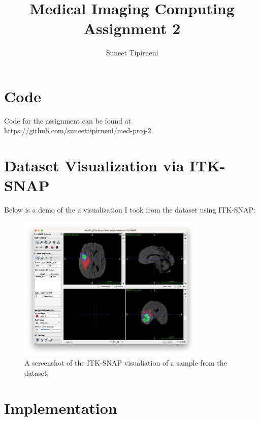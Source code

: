 \documentclass[onecolumn]{article}
\title{Medical Imaging Computing Assignment 2}
\author{Suneet Tipirneni}
\begin{document}
\maketitle
\section{Code}
Code for the assignment can be found at \url{https://github.com/suneettipirneni/med-proj-2}
\section{Dataset Visualization via ITK-SNAP}

Below is a demo of the a visualization I took from the dataset using ITK-SNAP:

\begin{figure}[htpb]
	\centering
	\includegraphics[width=0.8\textwidth]{imgs/itk-snap.png}
	\caption{A screenshot of the ITK-SNAP visualiation of a sample from the dataset.}
\end{figure}

\section{Implementation}
\end{document}
